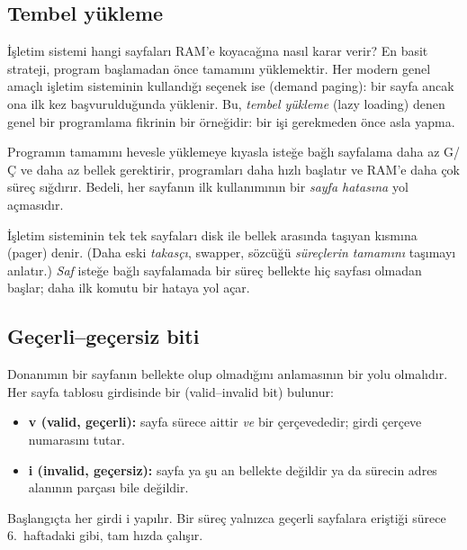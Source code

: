 \subsection{Tembel yükleme}

İşletim sistemi hangi sayfaları RAM'e koyacağına nasıl karar verir? En basit strateji, program başlamadan önce tamamını yüklemektir. Her modern genel amaçlı işletim sisteminin kullandığı seçenek ise  (demand paging): bir sayfa ancak ona ilk kez başvurulduğunda yüklenir. Bu, \emph{tembel yükleme} (lazy loading) denen genel bir programlama fikrinin bir örneğidir: bir işi gerekmeden önce asla yapma.

Programın tamamını hevesle yüklemeye kıyasla isteğe bağlı sayfalama daha az G/Ç ve daha az bellek gerektirir, programları daha hızlı başlatır ve RAM'e daha çok süreç sığdırır. Bedeli, her sayfanın ilk kullanımının bir \emph{sayfa hatasına} yol açmasıdır.

İşletim sisteminin tek tek sayfaları disk ile bellek arasında taşıyan kısmına  (pager) denir. (Daha eski \emph{takasçı}, swapper, sözcüğü \emph{süreçlerin tamamını} taşımayı anlatır.) \emph{Saf} isteğe bağlı sayfalamada bir süreç bellekte hiç sayfası olmadan başlar; daha ilk komutu bir hataya yol açar.

\subsection{Geçerli--geçersiz biti}

Donanımın bir sayfanın bellekte olup olmadığını anlamasının bir yolu olmalıdır. Her sayfa tablosu girdisinde bir  (valid--invalid bit) bulunur:
\begin{itemize}
  \item \textbf{v (valid, geçerli):} sayfa sürece aittir \emph{ve} bir çerçevededir; girdi çerçeve numarasını tutar.
  \item \textbf{i (invalid, geçersiz):} sayfa ya şu an bellekte değildir ya da sürecin adres alanının parçası bile değildir.
\end{itemize}
Başlangıçta her girdi i yapılır. Bir süreç yalnızca geçerli sayfalara eriştiği sürece 6.\ haftadaki gibi, tam hızda çalışır.

